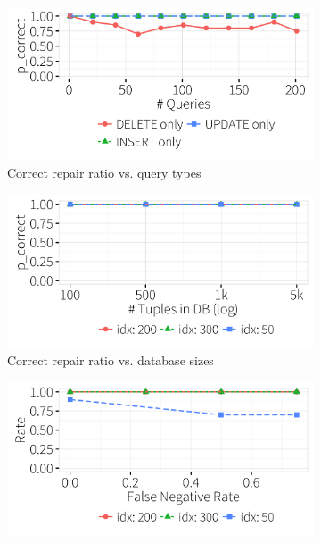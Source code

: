    \begin{figure}[t]
  \centering
  \begin{subfigure} [t]{.3\textwidth}
    \includegraphics[width = .99\columnwidth]{figures/indelup_acc_idx}
    \vspace*{-.25in}
    \caption{Correct repair ratio vs. query types}
    \label{f:querytyperatio} 
    \end{subfigure}
    \begin{subfigure} [t]{.3\textwidth}
    \includegraphics[width = .99\columnwidth]{figures/dbsize_acc_idx}
    \vspace*{-.25in}
    \caption{Correct repair ratio vs. database sizes}
    \label{f:dbsizeratio} 
    \end{subfigure}
    \begin{subfigure} [t]{.3\textwidth}
    \includegraphics[width = .99\columnwidth]{figures/noise_fn_acc_idx}

\end{subfigure}
\end{figure}
